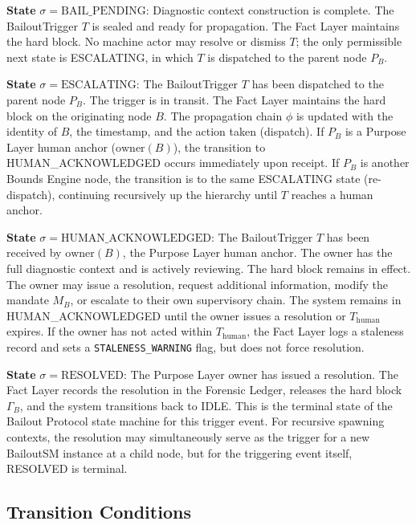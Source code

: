 \documentclass[12pt]{article}
\begin{document}
\bigskip

\noindent\textbf{State} $\sigma = \text{BAIL\_PENDING}$: Diagnostic context construction is complete. The BailoutTrigger $T$ is sealed and ready for propagation. The Fact Layer maintains the hard block. No machine actor may resolve or dismiss $T$; the only permissible next state is ESCALATING, in which $T$ is dispatched to the parent node $P_B$.

\bigskip

\noindent\textbf{State} $\sigma = \text{ESCALATING}$: The BailoutTrigger $T$ has been dispatched to the parent node $P_B$. The trigger is in transit. The Fact Layer maintains the hard block on the originating node $B$. The propagation chain $\phi$ is updated with the identity of $B$, the timestamp, and the action taken (dispatch). If $P_B$ is a Purpose Layer human anchor ($\text{owner}(B)$), the transition to HUMAN\_ACKNOWLEDGED occurs immediately upon receipt. If $P_B$ is another Bounds Engine node, the transition is to the same ESCALATING state (re-dispatch), continuing recursively up the hierarchy until $T$ reaches a human anchor.

\bigskip

\noindent\textbf{State} $\sigma = \text{HUMAN\_ACKNOWLEDGED}$: The BailoutTrigger $T$ has been received by $\text{owner}(B)$, the Purpose Layer human anchor. The owner has the full diagnostic context and is actively reviewing. The hard block remains in effect. The owner may issue a resolution, request additional information, modify the mandate $M_B$, or escalate to their own supervisory chain. The system remains in HUMAN\_ACKNOWLEDGED until the owner issues a resolution or $T_{\text{human}}$ expires. If the owner has not acted within $T_{\text{human}}$, the Fact Layer logs a staleness record and sets a \texttt{STALENESS\_WARNING} flag, but does not force resolution.

\bigskip

\noindent\textbf{State} $\sigma = \text{RESOLVED}$: The Purpose Layer owner has issued a resolution. The Fact Layer records the resolution in the Forensic Ledger, releases the hard block $\Gamma_B$, and the system transitions back to IDLE. This is the terminal state of the Bailout Protocol state machine for this trigger event. For recursive spawning contexts, the resolution may simultaneously serve as the trigger for a new BailoutSM instance at a child node, but for the triggering event itself, RESOLVED is terminal.

\subsection{Transition Conditions}
\label{sec:transition-conditions}
\end{document}

